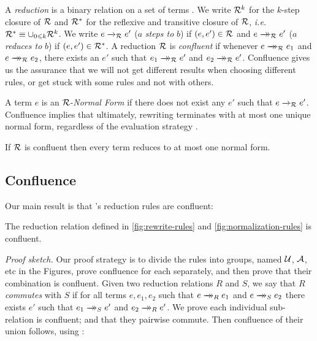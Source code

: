 \documentclass[acmsmall,review,anonymous,dvipsnames]{acmart}
\renewcommand{\leq}{\leqslant}
\newcommand{\ie}{\emph{i.e.}}	%
\newcommand{\lennart}[1]{{\color{dkcyan} [{LA}: #1]}}
\newcommand{\lennart}[1]{}
\begin{document}
%
A \emph{reduction} \rr is a binary relation on a set of terms \univ.
%
We write $\rr^{k}$ for the $k$-step closure of $\rr$ and $\rr^{*}$
for the reflexive and transitive closure of $\rr$, \ie $\rr^{*} \equiv \cup_{0 \leq k} \rr^k$.
%
We write $\rstep{\rr}{e}{e'}$ ($a$ \emph{steps to} $b$) if $(e, e') \in \rr$ and
$\rsteps{\rr}{e}{e'}$ ($a$ \emph{reduces to} $b$) if $(e, e') \in \rr^{*}$.
%
A reduction $\rr$ is \emph{confluent} if whenever $\rsteps{\rr}{e}{e_1}$ and $\rsteps{\rr}{e}{e_2}$,
there exists an $e'$ such that $\rsteps{\rr}{e_1}{e'}$ and $\rsteps{\rr}{e_2}{e'}$.
%
Confluence gives us the assurance that we will not get
different results when choosing different rules, or get
stuck with some rules and not with others.

%
A term $e$ is an $\rr$-\emph{Normal Form} if there does
not exist any $e'$ such that $\rstep{\rr}{e}{e'}$.
Confluence implies that ultimately, rewriting terminates
with at most one unique normal form, regardless of the
evaluation strategy \cite{Barendregt}.

\begin{lemma}[Unicity] \label{lem:nf}
If $\rr$ is confluent then every term reduces to at most one normal form.
\end{lemma}

\subsection{Confluence}

Our main result is that \versecalc{}'s reduction rules are confluent:
%

\begin{theorem}[Confluence] \label{thm:confluence}
  The reduction relation defined in \cref{fig:rewrite-rules}
  and \ref{fig:normalization-rules} is confluent.
\end{theorem}
\noindent
\emph{Proof sketch.}  Our proof strategy is to divide the rules into groups,
named $\runi$, $\rapp$, etc in the Figures, prove confluence for each separately,
and then prove that their combination is confluent.
Given two reduction relations $R$ and $S$, we say that $R$ \emph{commutes} with $S$ if for all terms
$e, e_1, e_2$ such that $\rsteps{R}{e}{e_1}$ and $\rsteps{S}{e}{e_2}$
there exists $e'$ such that $\rsteps{S}{e_1}{e'}$ and $\rsteps{R}{e_2}{e'}$.
%
We prove each individual sub-relation is confluent;
and that they pairwise commute. Then confluence of their union follows,
using \citet{Huet80}:
\end{document}
